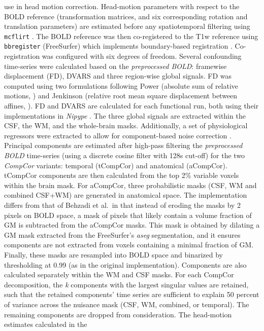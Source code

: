 \documentclass[
]{article}
\begin{document}
\begin{description}
use in head motion correction. Head-motion parameters with respect to
the BOLD reference (transformation matrices, and six corresponding
rotation and translation parameters) are estimated before any
spatiotemporal filtering using \texttt{mcflirt} \citep[FSL
,][]{mcflirt}. The BOLD reference was then co-registered to the T1w
reference using \texttt{bbregister} (FreeSurfer) which implements
boundary-based registration \citep{bbr}. Co-registration was configured
with six degrees of freedom. Several confounding time-series were
calculated based on the \emph{preprocessed BOLD}: framewise displacement
(FD), DVARS and three region-wise global signals. FD was computed using
two formulations following Power (absolute sum of relative motions,
\citet{power_fd_dvars}) and Jenkinson (relative root mean square
displacement between affines, \citet{mcflirt}). FD and DVARS are
calculated for each functional run, both using their implementations in
\emph{Nipype} \citep[following the definitions by][]{power_fd_dvars}.
The three global signals are extracted within the CSF, the WM, and the
whole-brain masks. Additionally, a set of physiological regressors were
extracted to allow for component-based noise correction
\citep[\emph{CompCor},][]{compcor}. Principal components are estimated
after high-pass filtering the \emph{preprocessed BOLD} time-series
(using a discrete cosine filter with 128s cut-off) for the two
\emph{CompCor} variants: temporal (tCompCor) and anatomical (aCompCor).
tCompCor components are then calculated from the top 2\% variable voxels
within the brain mask. For aCompCor, three probabilistic masks (CSF, WM
and combined CSF+WM) are generated in anatomical space. The
implementation differs from that of Behzadi et al.~in that instead of
eroding the masks by 2 pixels on BOLD space, a mask of pixels that
likely contain a volume fraction of GM is subtracted from the aCompCor
masks. This mask is obtained by dilating a GM mask extracted from the
FreeSurfer's \emph{aseg} segmentation, and it ensures components are not
extracted from voxels containing a minimal fraction of GM. Finally,
these masks are resampled into BOLD space and binarized by thresholding
at 0.99 (as in the original implementation). Components are also
calculated separately within the WM and CSF masks. For each CompCor
decomposition, the \emph{k} components with the largest singular values
are retained, such that the retained components' time series are
sufficient to explain 50 percent of variance across the nuisance mask
(CSF, WM, combined, or temporal). The remaining components are dropped
from consideration. The head-motion estimates calculated in the

\end{description}
\end{document}
